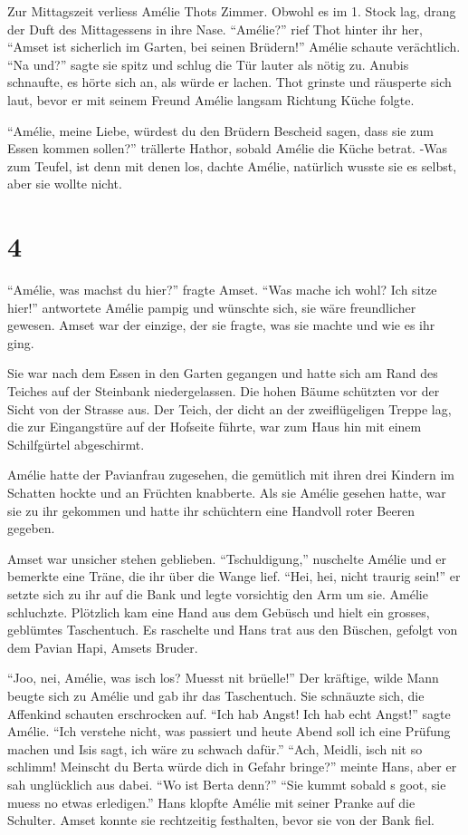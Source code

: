 \documentclass[11pt,titlepage,a5paper]{book}
\begin{document}
Zur Mittagszeit verliess Amélie Thots Zimmer. Obwohl es im 1. Stock lag, drang der Duft des Mittagessens in ihre Nase. "`Amélie?"' rief Thot hinter ihr her, "`Amset ist sicherlich im Garten, bei seinen Brüdern!"' Amélie schaute verächtlich. "`Na und?"' sagte sie spitz und schlug die Tür lauter als nötig zu. Anubis schnaufte, es hörte sich an, als würde er lachen. Thot grinste und räusperte sich laut, bevor er mit seinem Freund Amélie langsam Richtung Küche folgte.

"`Amélie, meine Liebe, würdest du den Brüdern Bescheid sagen, dass sie zum Essen kommen sollen?"' trällerte Hathor, sobald Amélie die Küche betrat. -Was zum Teufel, ist denn mit denen los, dachte Amélie, natürlich wusste sie es selbst, aber sie wollte nicht.

\section*{4}
 
"`Amélie, was machst du hier?"' fragte Amset. "`Was mache ich wohl? Ich sitze hier!"' antwortete Amélie pampig und wünschte sich, sie wäre freundlicher gewesen. Amset war der einzige, der sie fragte, was sie machte und wie es ihr ging.

Sie war nach dem Essen in den Garten gegangen und hatte sich am Rand des Teiches auf der Steinbank niedergelassen. Die hohen Bäume schützten vor der Sicht von der Strasse aus. Der Teich, der dicht an der zweiflügeligen Treppe lag, die zur Eingangstüre auf der Hofseite führte, war zum Haus hin mit einem Schilfgürtel abgeschirmt. 

Amélie hatte der Pavianfrau zugesehen, die gemütlich mit ihren drei Kindern im Schatten hockte und an Früchten knabberte. Als sie Amélie gesehen hatte, war sie zu ihr gekommen und hatte ihr schüchtern eine Handvoll roter Beeren gegeben.

Amset war unsicher stehen geblieben. "`Tschuldigung,"' nuschelte Amélie und er bemerkte eine Träne, die ihr über die Wange lief. "`Hei, hei, nicht traurig sein!"' er setzte sich zu ihr auf die Bank und legte vorsichtig den Arm um sie. Amélie schluchzte. Plötzlich kam eine Hand aus dem Gebüsch und hielt ein grosses, geblümtes Taschentuch. Es raschelte und Hans trat aus den Büschen, gefolgt von dem Pavian Hapi, Amsets Bruder.

"`Joo, nei, Amélie, was isch los? Muesst nit brüelle!"' Der kräftige, wilde Mann beugte sich zu Amélie und gab ihr das Taschentuch. Sie schnäuzte sich, die Affenkind schauten erschrocken auf. "`Ich hab Angst! Ich hab echt Angst!"' sagte Amélie. "`Ich verstehe nicht, was passiert und heute Abend soll ich eine Prüfung machen und Isis sagt, ich wäre zu schwach dafür."' "`Ach, Meidli, isch nit so schlimm! Meinscht du Berta würde dich in Gefahr bringe?"' meinte Hans, aber er sah unglücklich aus dabei. "`Wo ist Berta denn?"' "`Sie kummt sobald s goot, sie muess no etwas erledigen."' Hans  klopfte Amélie mit seiner Pranke auf die Schulter. Amset konnte sie rechtzeitig festhalten, bevor sie von der Bank fiel.
\end{document}
